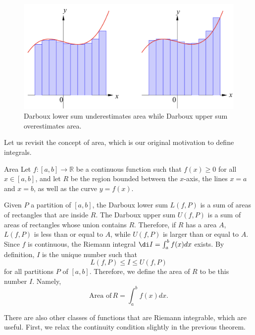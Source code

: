\begin{figure}[ht]
\centering
\includegraphics[scale=0.2]{Picture70.png}
\caption{Darboux lower sum underestimates area while Darboux upper sum overestimates area.  }\label{figure70}
\end{figure}
Let us revisit the concept of area, which is our original motivation to define integrals.
\begin{remark}{Area}
Let $f:[a,b]\to \mathbb{R}$ be a continuous function such that $f(x)\geq 0$ for all $x\in [a,b]$, and let $R$ be the region bounded between the $x$-axis, the lines $x=a$ and $x=b$, as well as the curve $y=f(x)$. 
\end{remark}\begin{highlight}{}Given $P$ a partition of $[a,b]$, the Darboux lower sum $L(f,P)$ is a sum of areas of rectangles that are inside $R$. The Darboux upper sum $U(f,P)$ is a sum of areas of rectangles whose union contains $R$. Therefore, if $R$ has a area $A$, $L(f,P)$ is less than or equal to  $A$, while $U(f,P)$ is larger than or equal to $A$. Since $f$ is continuous, the Riemann integral $\di I=\int_a^b f(x)dx$ exists. By definition, $I$ is the unique number such that
\[L(f,P)\leq I\leq U(f,P)\] for all partitions $P$ of $[a,b]$. Therefore, we define the area of $R$ to be this number $I$. Namely,
\[\text{Area of}\, R=\int_a^b f(x)dx.\]\end{highlight}

 




There are also other classes of functions that are Riemann integrable, which are useful. First, we relax the continuity condition slightly in the previous theorem.


